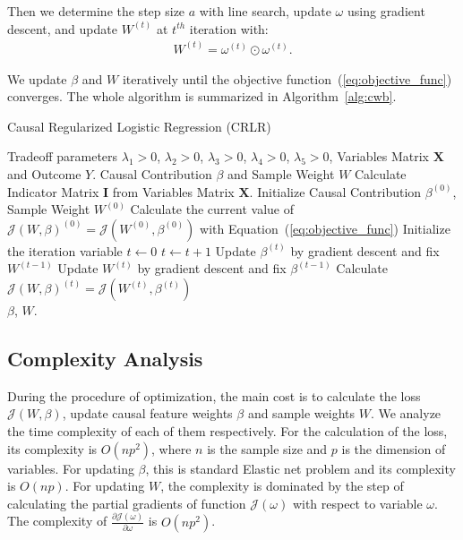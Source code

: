 \documentclass[sigconf]{acmart}
\begin{document}
Then we determine the step size $a$ with line search, update $\omega$ using gradient descent, and update $W^{(t)}$ at $t^{th}$ iteration with:
\begin{eqnarray}
\nonumber W^{(t)} = \omega^{(t)} \odot \omega^{(t)}.
\end{eqnarray}

We update $\beta$ and $W$ iteratively until the objective function~(\ref{eq:objective_func}) converges. The whole algorithm is summarized in Algorithm~\ref{alg:cwb}.

\begin{algorithm}[tbp]
\caption{{Causal Regularized Logistic Regression (CRLR)}}
\label{alg:cwb}
\begin{algorithmic}[1]
\Require
Tradeoff parameters $\lambda_1>0$, $\lambda_2>0$, $\lambda_3>0$, $\lambda_4>0$, $\lambda_5>0$, Variables Matrix $\textbf{X}$ and Outcome $Y$.
\Ensure
Causal Contribution $\beta$ and Sample Weight $W$
\State Calculate Indicator Matrix $\bm{I}$ from Variables Matrix $\bm{X}$.
\State Initialize Causal Contribution $\beta^{(0)}$, Sample Weight $W^{(0)}$
\State Calculate the current value of $\mathcal{J}(W,\beta)^{(0)} = \mathcal{J}(W^{(0)},\beta^{(0)})$ with Equation~(\ref{eq:objective_func})
\State Initialize the iteration variable $t\leftarrow 0$
\Repeat
\State $t\leftarrow t+1$
\State Update $\beta^{(t)}$ by gradient descent and fix $W^{(t-1)}$
\State Update $W^{(t)}$ by gradient descent and fix $\beta^{(t-1)}$
\State Calculate $\mathcal{J}(W,\beta)^{(t)} = \mathcal{J}(W^{(t)},\beta^{(t)})$
\\
\Return $\beta$, $W$.
\end{algorithmic}
\end{algorithm}\subsection{Complexity Analysis}
During the procedure of optimization, the main cost is to calculate the loss $\mathcal{J}(W,\beta)$, update causal feature weights $\beta$ and sample weights $W$.
We analyze the time complexity of each of them respectively.
For the calculation of the loss, its complexity is $O(np^2)$, where $n$ is the sample size and $p$ is the dimension of variables.
For updating $\beta$, this is standard Elastic net problem and its complexity is $O(np)$.
For updating $W$, the complexity is dominated by the step of calculating the partial gradients of function $\mathcal{J}(\omega)$ with respect to variable $\omega$. The complexity of $\frac{\partial \mathcal{J}(\omega)}{\partial \omega}$ is $O(np^2)$.
\end{document}
